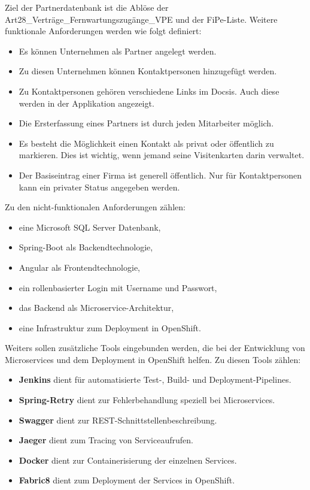 Ziel der Partnerdatenbank ist die Ablöse der Art28\_Verträge\_Fernwartungszugänge\_VPE und der FiPe-Liste.
Weitere funktionale Anforderungen werden wie folgt definiert:
\begin{itemize}
	\item Es können Unternehmen als Partner angelegt werden.
	\item Zu diesen Unternehmen können Kontaktpersonen hinzugefügt werden.
	\item Zu Kontaktpersonen gehören verschiedene Links im Docsis. Auch diese werden in der Applikation angezeigt.
	\item Die Ersterfassung eines Partners ist durch jeden Mitarbeiter möglich.
	\item Es besteht die Möglichkeit einen Kontakt als privat oder öffentlich zu markieren. Dies ist wichtig, wenn jemand seine Visitenkarten darin verwaltet.
	\item Der Basiseintrag einer Firma ist generell öffentlich. Nur für Kontaktpersonen kann ein privater Status angegeben werden.
\end{itemize}
Zu den nicht-funktionalen Anforderungen zählen:
\begin{itemize}
	\item eine Microsoft SQL Server Datenbank,
	\item Spring-Boot als Backendtechnologie,
	\item Angular als Frontendtechnologie,
	\item ein rollenbasierter Login mit Username und Passwort,
	\item das Backend als Microservice-Architektur,
	\item eine Infrastruktur zum Deployment in OpenShift.
\end{itemize}

Weiters sollen zusätzliche Tools eingebunden werden, die bei der Entwicklung von Microservices und dem Deployment in OpenShift helfen. Zu diesen Tools zählen:
\begin{itemize}
	\item \textbf{Jenkins} dient für automatisierte Test-, Build- und Deployment-Pipelines.
	\item \textbf{Spring-Retry} dient zur Fehlerbehandlung speziell bei Microservices.
	\item \textbf{Swagger} dient zur REST-Schnittstellenbeschreibung.
	\item \textbf{Jaeger} dient zum Tracing von Serviceaufrufen.
	\item \textbf{Docker} dient zur Containerisierung der einzelnen Services.
	\item \textbf{Fabric8} dient zum Deployment der Services in OpenShift.
\end{itemize}

